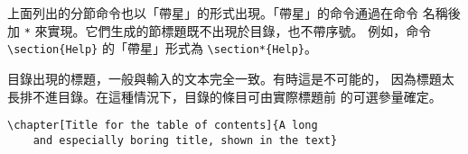 上面列出的分節命令也以「帶星」的形式出現。「帶星」的命令通過在命令
名稱後加 \verb|*| 來實現。它們生成的節標題既不出現於目錄，也不帶序號。
例如，命令 \verb|\section{Help}| 的「帶星」形式為 \verb|\section*{Help}|。


目錄出現的標題，一般與輸入的文本完全一致。有時這是不可能的，
因為標題太長排不進目錄。在這種情況下，目錄的條目可由實際標題前
的可選參量確定。

\begin{code}
\verb|\chapter[Title for the table of contents]{A long|\\
\verb|    and especially boring title, shown in the text}|
\end{code}

